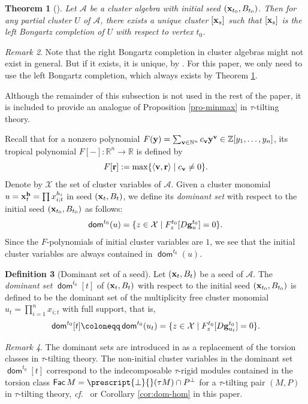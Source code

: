 \documentclass[10pt]{amsart}
\newtheorem{theorem}{Theorem}[section]
\theoremstyle{definition}
\newtheorem{definition}[theorem]{Definition}
\theoremstyle{remark}
\newtheorem{remark}[theorem]{Remark}
\numberwithin{equation}{section}
\newcommand{\opname}[1]{\operatorname{\mathsf{#1}}}
\newcommand{\Fac}{\opname{Fac}}
\newcommand{\dom}{\opname{dom}}
\newcommand{\confer}{\emph{cf.}\ }
\begin{document}
\begin{theorem}[{\cite[Theorem 4.15]{CGY-2023}}] \label{thm:CGY-completion}
Let $\mathcal A$ be a cluster algebra with initial seed $({\bf x}_{t_0}, B_{t_0})$.
Then for any partial cluster $U$ of $\mathcal A$, there exists a unique cluster $[{\bf x}_s]$ such that $[{\bf x}_s]$ is the left Bongartz completion of $U$ with respect to vertex $t_0$.
\end{theorem}

\begin{remark}
Note that the right Bongartz completion in cluster algebras might not exist in general. But if it exists, it is unique, by \cite[Corollary 5.5]{CGY-2023}. For this paper, we only need to use the left Bongartz completion, which always exists by Theorem \ref{thm:CGY-completion}. 
\end{remark}

Although the remainder of this subsection is not used in the rest of the paper, it is included to provide an analogue of Proposition \ref{pro-minmax} in $\tau$-tilting theory.

Recall that for a nonzero polynomial
$F({\bf y})=\sum_{{\bf v}\in\mathbb N^n}c_{\bf v}{\bf y}^{\bf v}\in\mathbb Z[y_1,\ldots,y_n]$, its tropical polynomial $F[-]:\mathbb R^n\to \mathbb R$ is defined by
\[F[{\bf r}]:=\max\{\langle{{\bf v},{\bf r}}\rangle\mid c_{\bf v}\neq 0\}.\]
  Denote by $\mathcal X$ the set of  cluster variables of $\mathcal A$. Given a cluster monomial $u={\bf x}_t^{\bf h}=\prod x_{i;t}^{h_i}$ in seed $({\bf x}_t, B_t)$, we define its {\em dominant set} with respect to the initial seed $({\bf x}_{t_0}, B_{t_0})$ as follows:
\[\dom^{t_0}(u)=\{z\in\mathcal X\mid F_z^{t_0}[D{\bf g}_u^{t_0}]=0\}.\]
Since the $F$-polynomials of initial cluster variables are $1$, we see that the initial cluster variables are always contained in $\dom^{t_0}(u)$.



\begin{definition}[Dominant set of a seed]
    Let  $({\bf x}_t, B_t)$ be a seed of $\mathcal A$. The {\em dominant set} $\dom^{t_0}[t]$ of $({\bf x}_t, B_t)$ with respect to the initial seed $({\bf x}_{t_0}, B_{t_0})$ is defined to be the dominant set of the  multiplicity free cluster monomial $u_t=\prod_{i=1}^nx_{i;t}$ with full support,  that is,
    \[
    \dom^{t_0}[t] \coloneqq   \dom^{t_0}(u_t)=\{z\in\mathcal X\mid F_z^{t_0}[D{\bf g}_{u_t}^{t_0}]=0\}.
    \]
\end{definition}
\begin{remark}
    The dominant sets are introduced in \cite{Cao-2023} as a replacement of the torsion classes in $\tau$-tilting theory. The non-initial cluster variables in the dominant set $\dom^{t_0}[t]$ correspond to the indecomposable $\tau$-rigid modules contained in the torsion class $\Fac M=\prescript{\bot}{}({\tau M})\cap P^\bot$ for a $\tau$-tilting pair $(M,P)$ in $\tau$-tilting theory,   \confer \cite[Proposition 7.23]{Cao-2023} or Corollary \ref{cor:dom-hom} in this paper.
\end{remark}
\end{document}
